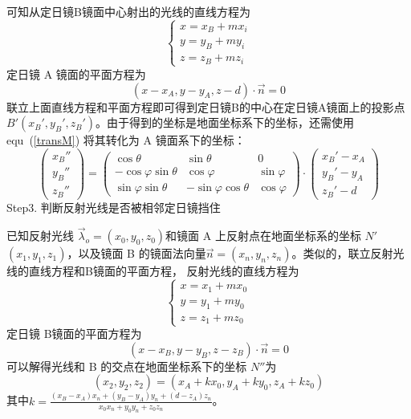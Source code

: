 \documentclass[../main.tex]{subfiles}
\begin{document}
可知从定日镜B镜面中心射出的光线的直线方程为
\[
\begin{cases}
x = x _{B} + m x_{i}\\
y = y _{B} + my_{i} \\
z = z_{B} + m z_{i}
\end{cases}
\]
定日镜 A 镜面的平面方程为
\[
(x - x_{A} , y- y _{A} , z - d) \cdot \vec n = 0
\]
联立上面直线方程和平面方程即可得到定日镜B的中心在定日镜A镜面上的投影点 \(B' (x_{B}' , y_{B} ' , z _{B} ')\)。由于得到的坐标是地面坐标系下的坐标，还需使用 equ~(\ref{transM}) 将其转化为 A 镜面系下的坐标：
\[
\begin{pmatrix}
x_{B} ''\\
y_{B} ''\\
z _{B} ''
\end{pmatrix}
=
\begin{pmatrix}
\cos \theta & \sin \theta & 0\\
-\cos \varphi \sin \theta & \cos \varphi & \sin \varphi \\
\sin \varphi \sin \theta & - \sin \varphi \cos \theta & \cos \varphi
\end{pmatrix}
\cdot
\begin{pmatrix}
x_{B} ' - x_{A}\\
y_{B}' - y_{A} \\
z_{B} ' - d
\end{pmatrix}
\]
Step3. 判断反射光线是否被相邻定日镜挡住

已知反射光线 \(\vec \lambda _{o} = (x_0,y_0,z_0)\)和镜面 A 上反射点在地面坐标系的坐标 \(N'\)\((x_1, y_1, z_1)\)，以及镜面 B 的镜面法向量\(\vec n = (x_{n} , y_{n} ,z_{n})\)。类似的，联立反射光线的直线方程和B镜面的平面方程，
反射光线的直线方程为
\[
\begin{cases}
x = x_1 + m x_0\\
y = y_1 + m y_0\\
z = z_1 + m z_0
\end{cases}
\]
定日镜 B镜面的平面方程为
\[
(x - x_{B} , y - y_{B} , z-z_{B}) \cdot \vec n = 0
\]
可以解得光线和 B 的交点在地面坐标系下的坐标 \(N''\)为
\[
(x_2 , y_2, z_2) = (x_{A} + k x_0, y_{A} + ky_{0} , z_{A} + kz_{0})
\]
其中\(k = \displaystyle \frac{(x_{B} - x_{A}) x_{n} + (y_{B} - y_{A}) y_{n} + (d- z_{A}) z_{n}}{x_0 x_{n} + y_{0} y_{n} + z_{0} z _{n}}\)。
\end{document}
